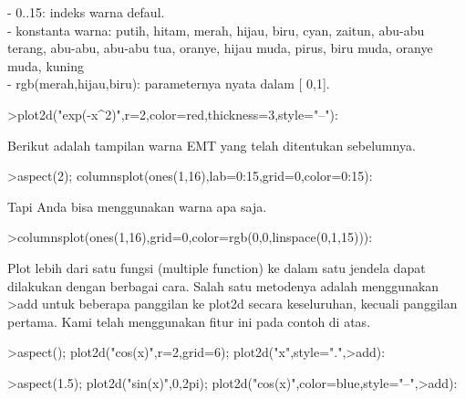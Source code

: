 \documentclass{article}
\begin{document}
\begin{eulernotebook}
\begin{eulercomment}
\begin{eulercomment}
\begin{eulercomment}
\begin{eulercomment}
\begin{eulercomment}
\begin{eulercomment}
\begin{eulercomment}
-  0..15:  indeks  warna  defaul.\\
-  konstanta  warna:  putih,  hitam,  merah,  hijau,  biru,  cyan,
zaitun,  abu-abu  terang,  abu-abu,  abu-abu  tua,  oranye,  hijau
muda, pirus,  biru  muda,  oranye  muda,  kuning  \\
-  rgb(merah,hijau,biru):  parameternya  nyata  dalam  [ 0,1].
\end{eulercomment}
\begin{eulerprompt}
>plot2d("exp(-x^2)",r=2,color=red,thickness=3,style="--"):
\end{eulerprompt}
\begin{eulercomment}
Berikut  adalah  tampilan  warna  EMT  yang  telah  ditentukan
sebelumnya.
\end{eulercomment}
\begin{eulerprompt}
>aspect(2); columnsplot(ones(1,16),lab=0:15,grid=0,color=0:15):
\end{eulerprompt}
\begin{eulercomment}
Tapi  Anda  bisa  menggunakan  warna  apa  saja.
\end{eulercomment}
\begin{eulerprompt}
>columnsplot(ones(1,16),grid=0,color=rgb(0,0,linspace(0,1,15))):
\end{eulerprompt}
\begin{eulercomment}
Plot  lebih  dari  satu  fungsi  (multiple  function)  ke  dalam  satu
jendela  dapat  dilakukan  dengan  berbagai  cara.  Salah  satu
metodenya adalah  menggunakan  \textgreater{}add  untuk  beberapa  panggilan  ke
plot2d  secara  keseluruhan,  kecuali  panggilan  pertama.  Kami telah
menggunakan  fitur  ini  pada  contoh  di  atas.
\end{eulercomment}
\begin{eulerprompt}
>aspect(); plot2d("cos(x)",r=2,grid=6); plot2d("x",style=".",>add):
\end{eulerprompt}
\begin{eulerprompt}
>aspect(1.5); plot2d("sin(x)",0,2pi); plot2d("cos(x)",color=blue,style="--",>add):
\end{eulerprompt}
\begin{eulercomment}

\end{eulercomment}
\end{eulercomment}
\end{eulercomment}
\end{eulercomment}
\end{eulercomment}
\end{eulercomment}
\end{eulercomment}
\end{eulernotebook}
\end{document}
